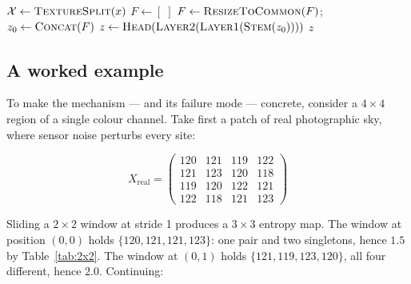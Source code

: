 \begin{algorithm}[t]
\caption{MLEP forward pass (generalised; the released model is the case
$\mathcal{W}=\{2\}$, $\mathcal{M}=\{\text{shannon}\}$, no texture split)}
\label{alg:mlep}
\BlankLine
$\mathcal{X} \leftarrow \textsc{TextureSplit}(x)$ 
$F \leftarrow [\;]$\;
$F \leftarrow \textsc{ResizeToCommon}(F)$;\quad $z_0 \leftarrow \textsc{Concat}(F)$ 
$z \leftarrow \textsc{Head}(\textsc{Layer2}(\textsc{Layer1}(\textsc{Stem}(z_0))))$\;
\Return $z$\;
\end{algorithm}

\subsection{A worked example}
\label{sec:worked-example}

To make the mechanism --- and its failure mode --- concrete, consider a
$4\times4$ region of a single colour channel. Take first a patch of real
photographic sky, where sensor noise perturbs every site:

\[
X_{\text{real}} =
\begin{pmatrix}
120 & 121 & 119 & 122\\
121 & 123 & 120 & 118\\
119 & 120 & 122 & 121\\
122 & 118 & 121 & 123
\end{pmatrix}
\]

Sliding a $2\times2$ window at stride 1 produces a $3\times3$ entropy map.
The window at position $(0,0)$ holds $\{120,121,121,123\}$: one pair and two
singletons, hence $1.5$ by Table~\ref{tab:2x2}. The window at $(0,1)$ holds
$\{121,119,123,120\}$, all four different, hence $2.0$. Continuing:

